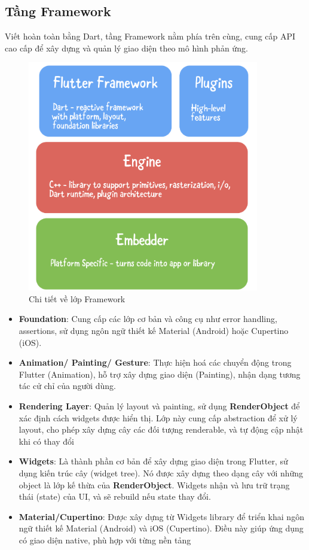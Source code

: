 \documentclass[../DoAn.tex]{subfiles}
\numberwithin{figure}{chapter}
\begin{document}
\subsection{Tầng Framework}
 Viết hoàn toàn bằng Dart, tầng Framework nằm phía trên cùng, cung cấp API cao cấp để xây dựng và quản lý giao diện theo mô hình phản ứng.
 \begin{figure}[H]
    \centering
    \includegraphics[width=0.9\textwidth]{Hinhve/Chuong5/flutterFramework.png}
    \caption{Chi tiết về lớp Framework}
    \label{fig:flutterframework}
\end{figure}
\begin{itemize}
    \item \textbf{Foundation}: Cung cấp các lớp cơ bản và công cụ như error handling, assertions, sử dụng ngôn ngữ thiết kế Material (Android) hoặc Cupertino (iOS).
    \item \textbf{Animation/ Painting/ Gesture}: Thực hiện hoá các chuyển động trong Flutter (Animation), hỗ trợ xây dựng giao diện (Painting), nhận dạng tương tác cử chỉ của người dùng.
    \item \textbf{Rendering Layer}: Quản lý layout và painting, sử dụng \textbf{RenderObject} để xác định cách widgets được hiển thị. Lớp này cung cấp abstraction để xử lý layout, cho phép xây dựng cây các đối tượng renderable, và tự động cập nhật khi có thay đổi
    \item \textbf{Widgets}: Là thành phần cơ bản để xây dựng giao diện trong Flutter, sử dụng kiến trúc cây (widget tree). Nó được xây dựng theo dạng cây với những object là lớp kế thừa của \textbf{RenderObject}. Widgets nhận và lưu trữ trạng thái (state) của UI, và sẽ rebuild nếu state thay đổi.
    \item \textbf{Material/Cupertino}: Được xây dựng từ Widgets library để triển khai ngôn ngữ thiết kế Material (Android) và iOS (Cupertino). Điều này giúp ứng dụng có giao diện native, phù hợp với từng nền tảng
\end{itemize}
\end{document}

